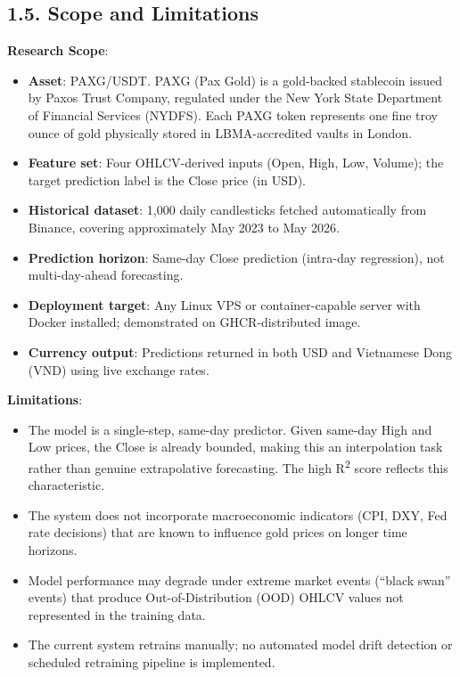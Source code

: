 \subsection{1.5. Scope and Limitations}

\textbf{Research Scope}:
\begin{itemize}
  \item \textbf{Asset}: PAXG/USDT. PAXG (Pax Gold) is a gold-backed stablecoin issued by Paxos Trust Company, regulated under the New York State Department of Financial Services (NYDFS). Each PAXG token represents one fine troy ounce of gold physically stored in LBMA-accredited vaults in London.
  \item \textbf{Feature set}: Four OHLCV-derived inputs (Open, High, Low, Volume); the target prediction label is the Close price (in USD).
  \item \textbf{Historical dataset}: 1,000 daily candlesticks fetched automatically from Binance, covering approximately May 2023 to May 2026.
  \item \textbf{Prediction horizon}: Same-day Close prediction (intra-day regression), not multi-day-ahead forecasting.
  \item \textbf{Deployment target}: Any Linux VPS or container-capable server with Docker installed; demonstrated on GHCR-distributed image.
  \item \textbf{Currency output}: Predictions returned in both USD and Vietnamese Dong (VND) using live exchange rates.
\end{itemize}

\textbf{Limitations}:
\begin{itemize}
  \item The model is a single-step, same-day predictor. Given same-day High and Low prices, the Close is already bounded, making this an interpolation task rather than genuine extrapolative forecasting. The high R\textsuperscript{2} score reflects this characteristic.
  \item The system does not incorporate macroeconomic indicators (CPI, DXY, Fed rate decisions) that are known to influence gold prices on longer time horizons.
  \item Model performance may degrade under extreme market events (``black swan'' events) that produce Out-of-Distribution (OOD) OHLCV values not represented in the training data.
  \item The current system retrains manually; no automated model drift detection or scheduled retraining pipeline is implemented.
\end{itemize}

